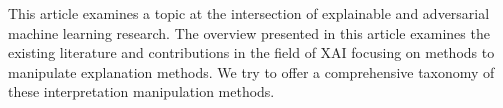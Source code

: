 





\newline
This article examines a topic at the intersection of explainable and adversarial machine learning research. 
The overview presented in this article examines the existing literature and contributions in the field of XAI focusing on methods to manipulate explanation methods. We try to offer a comprehensive taxonomy of these interpretation manipulation methods. 

